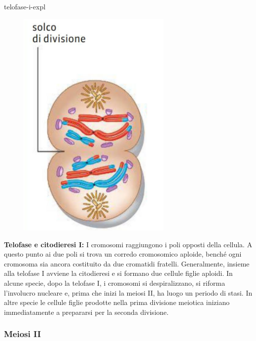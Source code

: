 \documentclass[preview]{standalone}
\begin{document}
\begin{snippet}{telofase-i-expl}
    \setlength{\intextsep}{0pt}%
    \begin{figure}
        \includegraphics[width=7.5cm]{./resources/telofase-i.png}
        \vspace{-1cm}
    \end{figure}

    \textbf{Telofase e citodieresi I:}
    I cromosomi raggiungono i poli opposti della cellula. A questo punto ai due poli si trova un
    corredo cromosomico aploide, benché ogni cromosoma sia ancora costituito da due
    cromatidi fratelli. Generalmente, insieme alla telofase I avviene la citodieresi e si formano
    due cellule figlie aploidi. In alcune specie, dopo la telofase I, i cromosomi si despiralizzano,
    si riforma l'involucro nucleare e, prima che inizi la meiosi II, ha luogo un periodo di stasi. In
    altre specie le cellule figlie prodotte nella prima divisione meiotica iniziano immediatamente
    a prepararsi per la seconda divisione.
    \wrapfill
\end{snippet}

\subsubsection{Meiosi II}

\end{document}
